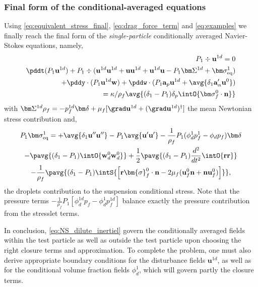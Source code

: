\subsubsection{Final form of the conditional-averaged equations}

Using  \ref{eq:equivalent_stress_final}, \ref{eq:drag_force_term} and \ref{eq:examples} we finally reach the final form of the \textit{single-particle}  conditionally averaged Navier-Stokes equations, namely, 
\begin{align}
    P_1 \div \textbf{u}^{1d} = 0 \\
    \pddt (P_1 \textbf{u}^{1d})
    + P_1 \div (
     \textbf{u}^{1d} \textbf{u}^{1d}  
    + \textbf{u} \textbf{u}^{1d} 
    + \textbf{u}^{1d} \textbf{u} 
    - P_1 \bm\Sigma^{1d}
    + \bm\sigma^1_\text{eq})\nonumber\\
    + \pddy\cdot (P_1 \textbf{u}^{1d} \textbf{w}) 
    + \pddw\cdot(P_1 \textbf{a}_p \textbf{u}^{1d} + \avg{\delta_1 \textbf{a}_\alpha' \textbf{u}^0} )\\
    = \kappa/\rho_f \avg{ (\delta_1 - P_1) \delta_p \intO{\bm\sigma_f^0\cdot \textbf{n}}}
    \label{eq:NS_dilute_inertiel}
\end{align}
with $\bm\Sigma^{1d} \rho_f  = -p_f^{1d} \bm\delta + \mu_f [\grad \textbf{u}^{1d}+(\grad \textbf{u}^{1d})^\dagger]$ the mean Newtonian stress contribution and, 
\begin{multline*}
    P_1\bm\sigma^1_\text{eq}
    = + \avg{\delta_1 \textbf{u}''\textbf{u}''}
    - P_1 \avg{ \textbf{u}'\textbf{u}'}
    - \frac{1}{\rho_f }P_1 (\phi_d^1 p_f^1 - \phi_d p_f)\bm\delta \\
    -  \pavg{(\delta_1 - P_1) \intO{\textbf{w}_d^0\textbf{w}_d^0 }}
    +  \frac{1}{2}\pavg{(\delta_1 - P_1)\frac{d^2}{dt^2} \intO{\textbf{rr}} } \\
    - \frac{1}{\rho_f}\pavg{(\delta_1 - P_1) \intS{\left[
        \textbf{r}\bm{\sigma}_f^0 \cdot \textbf{n}
        -  2 \mu_f (\textbf{u}_f^0 \textbf{n} + \textbf{n} \textbf{u}_f^0)
        \right] 
    }},
\end{multline*}
the droplets contribution to the suspension conditional stress. 
Note that the pressure terms $- \frac{1}{\rho_f }P_1 [\phi_d^{1d} p_f - \phi_d^1 p_f^{1d}]$ balance exactly the pressure contribution from the stresslet terms. 


In conclusion, \ref{eq:NS_dilute_inertiel} govern the conditionally averaged fields within the test particle as well as outside the test particle upon choosing the right closure terms and approximation. 
To complete the problem, one must also derive appropriate boundary conditions for the disturbance fields $\textbf{u}^{1d}$, as well as for the conditional volume fraction fields $\phi_d^1$, which will govern partly the closure terms. 

